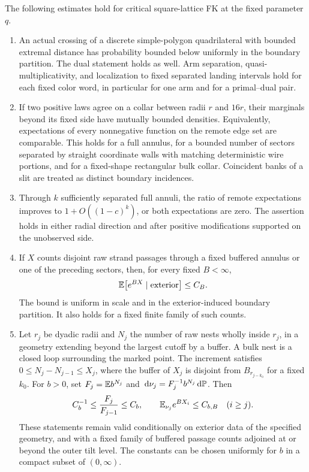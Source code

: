 \begin{standinginput}[FK localization]\label{inp:fk}
The following estimates hold for critical square-lattice FK at the
fixed parameter $q$.
\begin{enumerate}[label=(\roman*),leftmargin=*]
\item An actual crossing of a discrete simple-polygon quadrilateral
with bounded extremal distance has probability bounded below uniformly
in the boundary partition. The dual statement holds as well. Arm
separation, quasi-multiplicativity, and localization to fixed separated
landing intervals hold for each fixed color word, in particular for
one arm and for a primal--dual pair.
\item If two positive laws agree on a collar between radii $r$ and
$16r$, their marginals beyond its fixed side have mutually bounded
densities. Equivalently, expectations of every nonnegative function
on the remote edge set are comparable. This holds for a full annulus,
for a bounded number of sectors separated by straight coordinate walls
with matching deterministic wire portions, and for a fixed-shape
rectangular bulk collar. Coincident banks of a slit are treated as
distinct boundary incidences.
\item Through $k$ sufficiently separated full annuli, the ratio of
remote expectations improves to $1+O((1-c)^k)$, or both expectations
are zero. The assertion holds in either radial direction and after
positive modifications supported on the unobserved side.
\item If $X$ counts disjoint raw strand passages through a fixed
buffered annulus or one of the preceding sectors, then, for every
fixed $B<\infty$,
\[
 \mathbb E\bigl[e^{BX}\mid\text{exterior}\bigr]\le C_B.
\]
The bound is uniform in scale and in the exterior-induced boundary
partition. It also holds for a fixed finite family of such counts.
\item Let $r_j$ be dyadic radii and $N_j$ the number of raw nests wholly
inside $r_j$, in a geometry extending beyond the largest cutoff by a
buffer. A bulk nest is a closed loop surrounding the marked point.
The increment satisfies $0\le N_j-N_{j-1}\le X_j$, where the buffer
of $X_j$ is disjoint from $B_{r_{j-k_0}}$ for a fixed $k_0$.
For $b>0$, set $F_j=\mathbb E b^{N_j}$ and
$\,\mathrm d\nu_j=F_j^{-1}b^{N_j}\,\mathrm d\mathbb P$. Then
\[
 C_b^{-1}\le\frac{F_j}{F_{j-1}}\le C_b,
 \qquad \mathbb E_{\nu_j}e^{BX_i}\le C_{b,B}\quad(i\ge j).
\]
These statements remain valid conditionally on exterior data of the
specified geometry, and with a fixed family of buffered passage counts
adjoined at or beyond the outer tilt level. The constants can be chosen
uniformly for $b$ in a compact subset of $(0,\infty)$.
\end{enumerate}
\end{standinginput}

